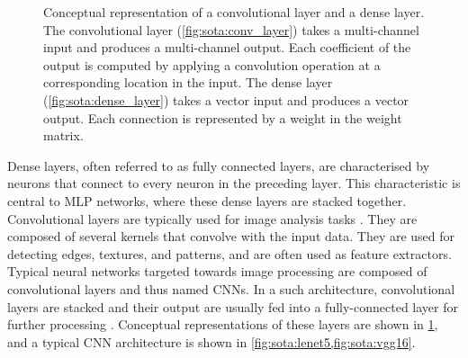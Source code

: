 \begin{figure}[htbp]
    \centering
        \caption{Conceptual representation of a convolutional layer and a dense
        layer. The convolutional layer (\cref{fig:sota:conv_layer}) takes a
        multi-channel input and produces a multi-channel output. Each coefficient of
        the output is computed by applying a convolution operation at a
        corresponding location in the input. The dense layer
        (\cref{fig:sota:dense_layer}) takes a vector input and produces a vector
        output. Each connection is represented by a weight in the weight matrix.}
    \label{fig:sota:layers}
    \end{figure}


Dense layers, often referred to as fully connected layers, are characterised by
neurons that connect to every neuron in the preceding layer. This characteristic
is central to \ac{MLP} networks, where these dense layers are stacked together.
Convolutional layers are typically used for image analysis tasks
\cite{DBLP:journals/pieee/LeCunBBH98}. They are composed of several kernels that
convolve with the input data. They are used for detecting edges, textures, and
patterns, and are often used as feature extractors. Typical neural networks
targeted towards image processing are composed of convolutional layers and thus
named \aclp{CNN}. In a such architecture, convolutional layers are stacked and
their output are usually fed into a fully-connected layer for further processing
\cite{DBLP:journals/corr/SimonyanZ14a,DBLP:conf/cvpr/HeZRS16,huang2017densely}.
Conceptual representations of these layers are shown in \cref{fig:sota:layers},
and a typical \ac{CNN} architecture is shown in
\cref{fig:sota:lenet5,fig:sota:vgg16}.\\

